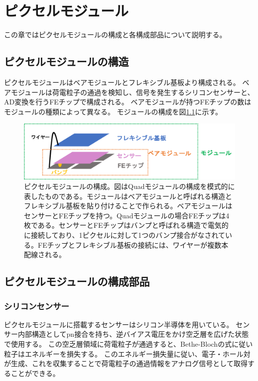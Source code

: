 \chapter{ピクセルモジュール}
この章ではピクセルモジュールの構成と各構成部品について説明する。

\section{ピクセルモジュールの構造}
ピクセルモジュールはベアモジュールとフレキシブル基板より構成される。
ベアモジュールは荷電粒子の通過を検知し、信号を発生するシリコンセンサーと、AD変換を行うFEチップで構成される。
ベアモジュールが持つFEチップの数はモジュールの種類によって異なる。
モジュールの構成を図\ref{module_configuration}に示す。

\begin{figure}[bpt]\centering
\includegraphics[width=14cm]{module_configuration}
\caption[ピクセルモジュールの構成]{ピクセルモジュールの構成。図はQuadモジュールの構成を模式的に表したものである。モジュールはベアモジュールと呼ばれる構造とフレキシブル基板を貼り付けることで作られる。ベアモジュールはセンサーとFEチップを持つ。Quadモジュールの場合FEチップは4枚である。センサーとFEチップはバンプと呼ばれる構造で電気的に接続しており、1ピクセルに対して1つのバンプ接合がなされている。FEチップとフレキシブル基板の接続には、ワイヤーが複数本配線される。}
\label{module_configuration}
\end{figure}

\section{ピクセルモジュールの構成部品}
\subsection{シリコンセンサー}
ピクセルモジュールに搭載するセンサーはシリコン半導体を用いている。
センサー内部構造としてpn接合を持ち、逆バイアス電圧をかけ空乏層を広げた状態で使用する\cite{2-1}。
この空乏層領域に荷電粒子が通過すると、Bethe-Blochの式\cite{2-3}に従い粒子はエネルギーを損失する。
このエネルギー損失量に従い、電子・ホール対が生成、これを収集することで荷電粒子の通過情報をアナログ信号として取得することができる。

